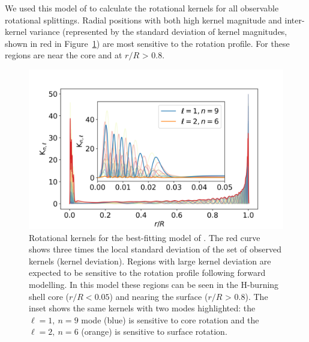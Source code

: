 
We  used this model of \thestar{} to calculate the rotational kernels for all observable rotational splittings. Radial positions with both high kernel magnitude and inter-kernel variance (represented by the standard deviation of kernel magnitudes, shown in red in Figure~\ref{fig:kern}) are most sensitive to the rotation profile. For \thestar{} these regions are near the core and at $r/R$ > $0.8$.

\begin{figure}
    \includegraphics[width=\textwidth]{Figures/subgiant_chapter_figures/staradif.png}
    \caption{Rotational kernels for the best-fitting model of \thestar{}. The red curve shows three times the local standard deviation of the set of observed kernels (kernel deviation). Regions with large kernel deviation are expected to be sensitive to the rotation profile following forward modelling. In this model these regions can be seen in the H-burning shell core ($r/R<0.05$) and nearing the surface ($r/R$ > $0.8$). The inset shows the same kernels with two modes highlighted: the $\ell = 1,\ n=9$ mode (blue) is sensitive to core rotation and the $\ell = 2,\ n = 6$ (orange) is sensitive to surface rotation.}
    \label{fig:kern}
\end{figure}

